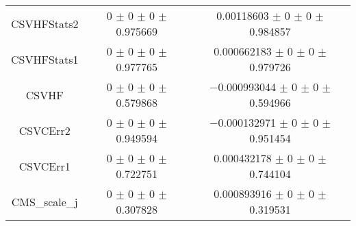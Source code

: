 \begin{table}
\begin{tabular}{ccc}
CSVHFStats2 	& \num{0} $\pm$ \num{0} $\pm$ \num{0} $\pm$ \num{0.975669} 	& \num{0.00118603} $\pm$ \num{0} $\pm$ \num{0} $\pm$ \num{0.984857}\\
CSVHFStats1 	& \num{0} $\pm$ \num{0} $\pm$ \num{0} $\pm$ \num{0.977765} 	& \num{0.000662183} $\pm$ \num{0} $\pm$ \num{0} $\pm$ \num{0.979726}\\
CSVHF 	& \num{0} $\pm$ \num{0} $\pm$ \num{0} $\pm$ \num{0.579868} 	& \num{-0.000993044} $\pm$ \num{0} $\pm$ \num{0} $\pm$ \num{0.594966}\\
CSVCErr2 	& \num{0} $\pm$ \num{0} $\pm$ \num{0} $\pm$ \num{0.949594} 	& \num{-0.000132971} $\pm$ \num{0} $\pm$ \num{0} $\pm$ \num{0.951454}\\
CSVCErr1 	& \num{0} $\pm$ \num{0} $\pm$ \num{0} $\pm$ \num{0.722751} 	& \num{0.000432178} $\pm$ \num{0} $\pm$ \num{0} $\pm$ \num{0.744104}\\
CMS\_scale\_j 	& \num{0} $\pm$ \num{0} $\pm$ \num{0} $\pm$ \num{0.307828} 	& \num{0.000893916} $\pm$ \num{0} $\pm$ \num{0} $\pm$ \num{0.319531}\\
\bottomrule
\end{tabular}
\end{table}